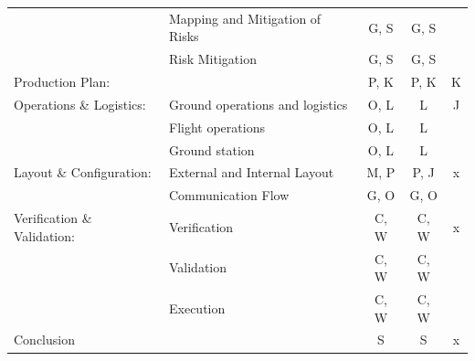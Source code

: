 \begin{longtable}[htb]{p{4cm}p{3cm}ccc}
        & Mapping and Mitigation of Risks & G, S & G, S & \\ \hdashline
        & Risk Mitigation & G, S & G, S &  \\ \hdashline
    Production Plan: & & P, K & P, K & K \\ \hdashline
    Operations \& Logistics: & Ground operations and logistics & O, L & L & J \\ \hdashline
        & Flight operations & O, L & L & \\ \hdashline
        & Ground station & O, L & L & \\ \hdashline
    Layout \& Configuration: & External and Internal Layout & M, P & P, J & x \\ \hdashline
        & Communication Flow & G, O & G, O & \\ \hdashline
    Verification \& Validation: & Verification & C, W & C, W & x \\ \hdashline
         & Validation & C, W & C, W & \\ \hdashline
         & Execution & C, W & C, W & \\ \hdashline
    Conclusion & & S & S & x \\ 
    \bottomrule
\end{longtable}
